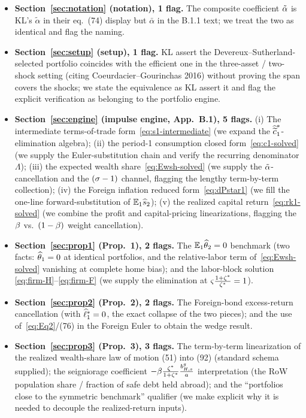 \begin{itemize}[leftmargin=1.6em,itemsep=2pt]
  \item \textbf{Section~\ref{sec:notation} (notation), 1 flag.} The composite
  coefficient $\tilde{\alpha}$ is KL's $\tilde\alpha$ in their eq.~(74) display but
  $\bar\alpha$ in the B.1.1 text; we treat the two as identical and flag the
  naming.

  \item \textbf{Section~\ref{sec:setup} (setup), 1 flag.} KL assert the
  Devereux--Sutherland-selected portfolio coincides with the efficient one in the
  three-asset / two-shock setting (citing Coeurdacier--Gourinchas 2016) without
  proving the span covers the shocks; we state the equivalence as KL assert it and
  flag the explicit verification as belonging to the portfolio engine.

  \item \textbf{Section~\ref{sec:engine} (impulse engine, App.~B.1), 5 flags.}
  (i) The intermediate terms-of-trade form~\eqref{eq:s1-intermediate} (we expand
  the $\widehat{\widetilde{c}}^{*}_1$-elimination algebra); (ii) the period-1 consumption
  closed form~\eqref{eq:c1-solved} (we supply the Euler-substitution chain and
  verify the recurring denominator $\Lambda$); (iii) the expected wealth
  share~\eqref{eq:Ewsh-solved} (we supply the $\tilde{\alpha}$-cancellation and the
  $(\sigma-1)$ channel, flagging the lengthy term-by-term collection); (iv) the
  Foreign inflation reduced form~\eqref{eq:dPstar1} (we fill the one-line
  forward-substitution of $\mathbb{E}_1\widehat{s}_2$); (v) the realized capital
  return~\eqref{eq:rk1-solved} (we combine the profit and capital-pricing
  linearizations, flagging the $\beta$ vs.~$(1-\beta)$ weight cancellation).

  \item \textbf{Section~\ref{sec:prop1} (Prop.~1), 2 flags.} The
  $\mathbb{E}_1\widehat{\theta}_2=0$ benchmark (two facts: $\widehat{\theta}_1=0$ at identical
  portfolios, and the relative-labor term of~\eqref{eq:Ewsh-solved} vanishing at
  complete home bias); and the labor-block solution
  \eqref{eq:firm-H}--\eqref{eq:firm-F} (we supply the elimination at
  $\varsigma\frac{1+\zeta^{*}}{\zeta^{*}}=1$).

  \item \textbf{Section~\ref{sec:prop2} (Prop.~2), 2 flags.} The Foreign-bond
  excess-return cancellation (with $\widehat{\ell}^{*}_1=0$, the exact collapse of the
  two pieces); and the use of~\eqref{eq:Eq2}/(76) in the Foreign Euler to obtain
  the wedge result.

  \item \textbf{Section~\ref{sec:prop3} (Prop.~3), 3 flags.} The term-by-term
  linearization of the realized wealth-share law of motion (51) into (92)
  (standard schema supplied); the seigniorage coefficient
  $-\beta\frac{\zeta^{*}}{1+\zeta^{*}}\frac{b^g_{H,s}}{a}$ interpretation (the RoW
  population share / fraction of safe debt held abroad); and the
  ``portfolios close to the symmetric benchmark'' qualifier (we make explicit why
  it is needed to decouple the realized-return inputs).


\end{itemize}
